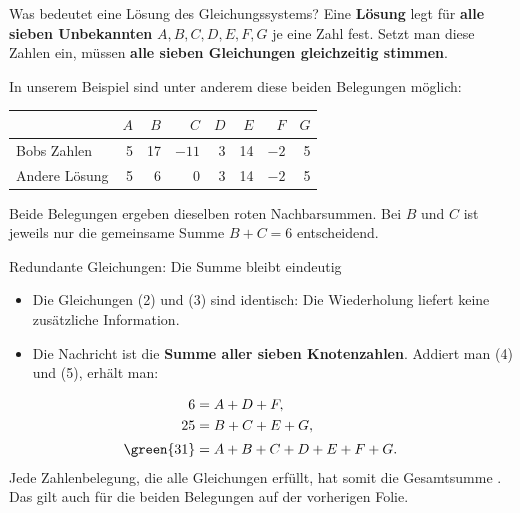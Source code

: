 \begin{frame}{Was bedeutet eine Lösung des Gleichungssystems?}
	Eine \textbf{Lösung} legt für \textbf{alle sieben Unbekannten}
	$A, B, C, D, E, F, G$ je eine Zahl fest. Setzt man diese Zahlen ein,
	müssen \textbf{alle sieben Gleichungen gleichzeitig stimmen}.

	\medskip
	In unserem Beispiel sind unter anderem diese beiden Belegungen möglich:
	\begin{center}
		\begin{tabular}{lrrrrrrr}
			\toprule
			& $A$ & $B$ & $C$ & $D$ & $E$ & $F$ & $G$ \\
			\midrule
			Bobs Zahlen & 5 & 17 & $-11$ & 3 & 14 & $-2$ & 5 \\
			Andere Lösung & 5 & 6 & 0 & 3 & 14 & $-2$ & 5 \\
			\bottomrule
		\end{tabular}
	\end{center}
	Beide Belegungen ergeben dieselben roten Nachbarsummen.
	Bei $B$ und $C$ ist jeweils nur die gemeinsame Summe $B+C=6$ entscheidend.
\end{frame}

\begin{frame}{Redundante Gleichungen: Die Summe bleibt eindeutig}
	\begin{itemize}
		\item Die Gleichungen (2) und (3) sind identisch: Die Wiederholung liefert keine zusätzliche Information.
		\item Die Nachricht ist die \textbf{Summe aller sieben Knotenzahlen}. Addiert man (4) und (5), erhält man:
	\end{itemize}
	\[
		\begin{aligned}
			6 &= A + D + F, \\
			25 &= B + C + E + G, \\[2pt]
			\green{31} &= A + B + C + D + E + F + G.
		\end{aligned}
	\]
	Jede Zahlenbelegung, die alle Gleichungen erfüllt, hat somit die Gesamtsumme . Das gilt auch für die beiden Belegungen auf der vorherigen Folie.
\end{frame}

